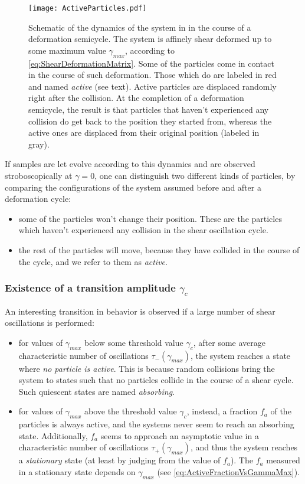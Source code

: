 \begin{figure} 
\centering 
\texttt{[image: ActiveParticles.pdf]} 
\caption{Schematic of the dynamics of the system in \cite{corte2008random} in the course of a deformation semicycle. The system is affinely shear deformed up to some maximum value $\gamma_{max}$, according to \autoref{eq:ShearDeformationMatrix}. Some of the particles come in contact in the course of such deformation. Those which do are labeled in red and named \emph{active} (see text). Active particles are displaced randomly right after the collision. At the completion of a deformation semicycle, the result is that particles that haven't experienced any collision do get back to the position they started from, whereas the active ones are displaced from their original position (labeled in gray). \label{fig:ShearedSuspensionSetup}}
\end{figure}

If samples are let evolve according to this dynamics and are observed stroboscopically at $\gamma = 0$, one can distinguish two different kinds of particles, by comparing the configurations of the system assumed before and after a deformation cycle: 
\begin{itemize}
	\item some of the particles won't change their position. These are the particles which haven't experienced any collision in the shear oscillation cycle.
	\item the rest of the particles will move, because they have collided in the course of the cycle, and we refer to them as \emph{active}.
\end{itemize}

\subsubsection{Existence of a transition amplitude $\gamma_{c}$}

An interesting transition in behavior is observed if a large number of shear oscillations is performed: 

\begin{itemize}
\item for values of $\gamma_{max}$ below some threshold value $\gamma_{c}$, after some average characteristic number of oscillations $\tau_{-}(\gamma_{max})$, the system reaches a state where \emph{no particle is active}. This is because random collisions bring the system to states such that no particles collide in the course of a shear cycle. Such quiescent states are named \emph{absorbing}.
\item for values of $\gamma_{max}$ above the threshold value $\gamma_{c}$, instead, a fraction $f_{a}$ of the particles is always active, and the systems never seem to reach an absorbing state. Additionally, $f_{a}$ seems to approach an asymptotic value in a characteristic number of oscillations $\tau_{+}(\gamma_{max})$, and thus the system reaches a \emph{stationary} state (at least by judging from the value of $f_{a}$). The $f_{a}$ measured in a stationary state depends on $\gamma_{max}$ (see \autoref{eq:ActiveFractionVsGammaMax}).
\end{itemize}


